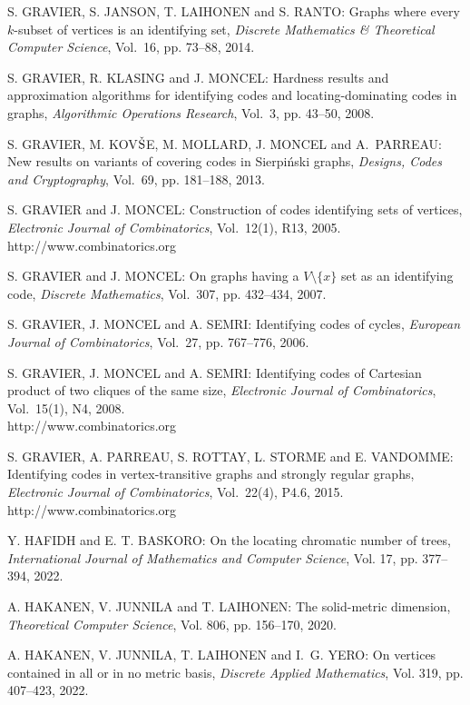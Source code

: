 \begin{thebibliography}{999}
S. GRAVIER, S. JANSON, T. LAIHONEN and S. RANTO: Graphs where every $k$-subset of vertices is an identifying set, {\it Discrete Mathematics \& Theoretical Computer Science}, Vol.~16, pp. 73--88, 2014.

S. GRAVIER, R. KLASING and J. MONCEL: Hardness results and approximation algorithms for identifying codes and locating-dominating codes in graphs, {\it Algorithmic Operations Research}, Vol.~3, pp. 43--50, 2008.

S. GRAVIER, M. KOV$\check{\rm S}$E, M. MOLLARD, J. MONCEL and A.~PARREAU: New results on variants of covering codes in Sierpi\'nski graphs, {\it Designs, Codes and Cryptography}, Vol.~69, pp. 181--188, 2013.

S. GRAVIER and J. MONCEL: Construction of codes identifying sets of vertices, {\it Electronic Journal of Combinatorics}, Vol.~12(1), R13, 2005.\\
http://www.combinatorics.org

S. GRAVIER and J. MONCEL: On graphs having a $V \setminus \{ x \}$ set as an identifying code, {\it Discrete Mathematics}, Vol.~307, pp. 432--434, 2007.

S. GRAVIER, J. MONCEL and A. SEMRI: Identifying codes of cycles, {\it European Journal of Combinatorics}, Vol.~27, pp. 767--776, 2006.

S. GRAVIER, J. MONCEL and A. SEMRI: Identifying codes of Cartesian product of two cliques of the same size, {\it Electronic Journal of Combinatorics}, Vol.~15(1), N4, 2008.\\
http://www.combinatorics.org

S. GRAVIER, A. PARREAU, S. ROTTAY, L. STORME and E. VANDOMME: Identifying codes in vertex-transitive graphs and strongly regular graphs, {\it Electronic Journal of Combinatorics}, Vol.~22(4), P4.6, 2015.\\
http://www.combinatorics.org

Y. HAFIDH and E. T. BASKORO: On the locating chromatic number of trees, {\it  International Journal of Mathematics and Computer Science}, Vol. 17, pp. 377--394, 2022.

A. HAKANEN, V. JUNNILA and T. LAIHONEN: The solid-metric dimension, {\it Theoretical Computer Science}, Vol. 806, pp. 156--170, 2020.

A. HAKANEN, V. JUNNILA, T. LAIHONEN and I.~G. YERO: On vertices contained in all or in no metric basis, {\it Discrete Applied Mathematics}, Vol. 319, pp. 407--423, 2022.


\end{thebibliography}
